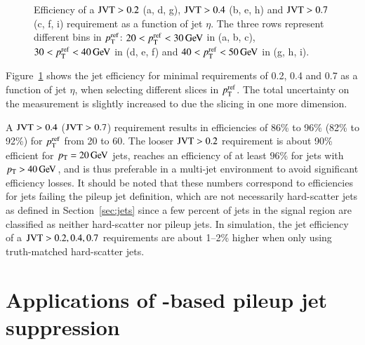 \documentclass{atlasnote}
\begin{document}
\begin{figure}[!htbp]
{      \label{fig:JVTCal_0p4_eta_pt40to50}
  }
  \caption{Efficiency of a ${\rm JVT}>0.2$ (a, d, g), ${\rm JVT}>0.4$ (b, e, h) and ${\rm JVT}>0.7$ (c, f, i) requirement as a function of jet $\eta$. 
  The three rows represent different bins in $p_{\mathrm{T}}^{\rm ref}$: $20<p_{\mathrm{T}}^{\rm ref}<30 \,\text{Ge\hspace{-.08em}V}$ in (a, b, c), $30<p_{\mathrm{T}}^{\rm ref}<40 \,\text{Ge\hspace{-.08em}V}$ in (d, e, f) and $40<p_{\mathrm{T}}^{\rm ref}<50 \,\text{Ge\hspace{-.08em}V}$ in (g, h, i). }
  \label{fig:JVTCalibration_eta}
\end{figure}
Figure~\ref{fig:JVTCalibration_eta} shows the jet efficiency for minimal \JVT requirements of 0.2, 0.4 and 0.7
as a function of jet $\eta$, when selecting different slices in $p_{\mathrm{T}}^{\rm ref}$. The total uncertainty on the measurement is slightly increased to due
the slicing in one more dimension. 



A ${\rm JVT} > 0.4$ (${\rm JVT} >0.7$) requirement results in efficiencies of 86\% to 96\% (82\% to 92\%) for $p_{\mathrm{T}}^{\rm ref}$ from 20 to 60\GeV. 
The looser ${\rm JVT} > 0.2$ requirement is about 90\% efficient for $p_{\mathrm{T}} = 20 \,\text{Ge\hspace{-.08em}V}$ jets, reaches an efficiency of at least $96\%$ for jets with $p_{\mathrm{T}} > 40\,\text{Ge\hspace{-.08em}V}$, and is thus
preferable in a multi-jet environment to avoid significant efficiency losses. 
It should be noted that these numbers correspond to efficiencies for jets failing the pileup jet definition, 
which are not necessarily
hard-scatter jets as defined in Section~\ref{sec:jets} since a few percent of jets in the signal region are classified as neither hard-scatter nor pileup jets. 
In simulation, the jet efficiency of a ${\rm JVT} > 0.2,0.4,0.7$ requirements are about 1--2\% higher when only using truth-matched hard-scatter jets. 


\section{Applications of \JVT-based pileup jet suppression}
\label{sec:JVTapplication}
\end{document}
